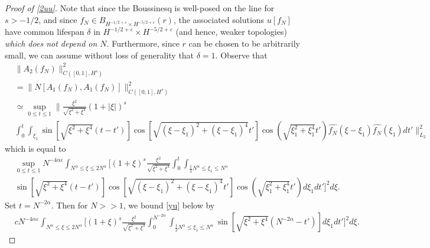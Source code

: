 \documentclass[12pt,reqno]{amsart}
\numberwithin{equation}{section}  %
\newcommand{\wh}{\widehat}
\newcommand{\ee}{\varepsilon}
\begin{document}
\begin{proof}[Proof of \ref{2uu}]
Note that since the Boussinesq is well-posed on the line for $s
> -1/2$, and since $f_{N} \in B_{H^{-1/2 + \ee} \times H^{-5/2 + \ee}}(r)$,
the associated
solutions $u[f_{N}]$ have common lifespan $\delta$ in $H^{-1/2 + \ee} \times 
H^{-5/2 + \ee}$ (and hence, weaker topologies) \emph{which does not depend
on $N$}. Furthermore, since $r$
can be chosen to be arbitrarily small, we can assume without loss of generality that
$\delta =1$. Observe that
%
%
\begin{equation}
  \label{pre-loc}
\begin{split}
  & \| A_{2}(f_{N}) \|_{C([0, 1], H^{s})}^{2} 
  \\
  & =  \| N[A_{1}(f_{N}), A_{1}(f_{N})] \|_{C([0, 1],
  H^{s})}^{2} 
  \\
& \simeq \sup_{0 \le t \le 1}\| \frac{\xi^{2}}{\sqrt{\xi^{2} + \xi^{4}}}(1 + | \xi |)^{s}
\\
& \int_{0}^{t} \int_{\xi_{1}} \sin[\sqrt{\xi^{2} + \xi^{4}}(t-t')]
\cos[\sqrt{(\xi - \xi_{1})^{2} + (\xi - \xi_{1})^{4}}t']
\cos(\sqrt{\xi_{1}^{2} + \xi_{1}^{4}}t') \wh{f_{N}}(\xi - \xi_{1})\wh{f_{N}}(\xi_{1}) dt'
\|_{L_{2}}^{2}
\end{split}
\end{equation}
%
which is equal to
%
%
\begin{equation}
  \label{yu}
\begin{split}
  & \sup_{0 \le t \le 1} N^{-4 \alpha \ee}\int_{N^{\alpha} \le \xi \le 2 N^{\alpha}}
  \Big[ (1 + \xi)^{s}
  \frac{\xi^{2}}{\sqrt{\xi^{2} + \xi^{4}}} \int_{0}^{t}
  \int_{\frac{1}{2}
  N^{\alpha} \le \xi_{1} \le N^{\alpha}}
  \\
  & \sin[\sqrt{\xi^{2} + \xi^{4}}(t-t')]
  \cos[\sqrt{(\xi - \xi_{1})^{2} + (\xi - \xi_{1})^{4}}t']
\cos(\sqrt{\xi_{1}^{2} + \xi_{1}^{4}}t') d \xi_{1} dt' \Big ]^{2} d \xi.
\end{split}
\end{equation}
%
%
Set $t = N^{-2\alpha}$. Then for $N>>1$, we bound \eqref{yu} below by
%
%
%
%
\begin{equation*}
\begin{split}
  & c N^{-4 \alpha \ee}\int_{N^{\alpha} \le \xi \le 2 N^{\alpha}}
  \Big[ (1 + \xi)^{s}
  \frac{\xi^{2}}{\sqrt{\xi^{2} + \xi^{4}}} \int_{0}^{N^{-2 \alpha}}
  \int_{\frac{1}{2}
  N^{\alpha} \le \xi_{1} \le N^{\alpha}}
  \sin[\sqrt{\xi^{2} + \xi^{4}}(N^{-2 \alpha}-t')] d \xi_{1} dt' \Big ]^{2} d
  \xi.
\end{split}
\end{equation*}

\end{proof}
\end{document}
